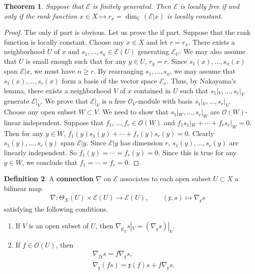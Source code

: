 \documentclass[12pt,a4paper,notitlepage]{report}
\theoremstyle{definition}
\newtheorem{df}{Definition}[section]
\theoremstyle{plain}
\newtheorem{thm}[df]{Theorem}
\newcommand{\fk}{\mathfrak}
\newcommand{\scr}{\mathscr}
\newcommand{\mbb}{\mathbb}
\numberwithin{equation}{section}
\begin{document}
\begin{thm}\label{lb59}
Suppose that $\scr E$ is finitely generated. Then $\scr E$ is locally free if and only if the rank function $x\in X\mapsto r_x=\dim_{\mbb C}(\scr E|x)$ is locally constant.
\end{thm}

\begin{proof}
The only if part is obvious. Let us prove the if part. Suppose that the rank function is locally constant. Choose any $x\in X$ and let $r=r_x$. There exists a neighborhood $U$ of $x$ and $s_1,\dots,s_n\in\scr E(U)$ generating $\scr E_U$. We may also assume that $U$ is small enough such that for any $y\in U$, $r_y=r$. Since $s_1(x),\dots,s_n(x)$ span $\scr E|x$, we must have $n\geq r$. By rearranging $s_1,\dots,s_n$, we may assume that $s_1(x),\dots,s_r(x)$ form a basis of the vector space $\scr E_x$. Thus, by Nakayama's lemma, there exists a neighborhood $V$ of $x$ contained in $U$ such that $s_1|_V,\dots,s_r|_V$ generate $\scr E|_V$. We prove that $\scr E|_V$ is a free $\scr O_V$-module with basis $s_1|_V,\dots,s_r|_V$. Choose any open subset $W\subset V$. We need to show that $s_1|_W,\dots,s_r|_W$ are $\scr O(W)$-linear independent. Suppose that $f_1,\dots,f_r\in\scr O(W)$ and $f_1s_1|_W+\cdots+f_rs_r|_W=0$. Then for any $y\in W$, $f_1(y)s_1(y)+\cdots+f_r(y)s_r(y)=0$. Clearly $s_1(y),\dots,s_r(y)$ span $\scr E|y$. Since $\scr E|y$ has dimension $r$, $s_1(y),\dots,s_r(y)$ are linearly independent. So $f_1(y)=\cdots=f_r(y)=0$. Since this is true for any $y\in W$, we conclude that $f_1=\cdots=f_r=0$. 
\end{proof}









\begin{df}\label{lb49}
A \textbf{connection} $\nabla$ on $\scr E$ associates to each open subset $U\subset X$ a bilinear map
\begin{gather*}
\nabla:\Theta_X(U)\times\scr E(U)\rightarrow\scr E(U),\qquad (\fk x,s)\mapsto \nabla_{\fk x} s
\end{gather*}
satisfying the following conditions.

\begin{enumerate}[label=(\alph*)]
\item If $V$ is an open subset of $U$, then $\nabla_{\fk x|_V}s|_V=(\nabla_{\fk x} s)|_V$.
\item If $f\in\scr O
(U)$, then
\begin{gather*}
\nabla_{f\fk x}s=f\nabla_{\fk x}s,\\
\nabla_{\fk x}(fs)=\fk x(f)s+f\nabla_{\fk x}s.
\end{gather*}
\end{enumerate}
\end{df}
\end{document}
